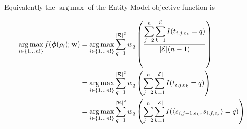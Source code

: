 \documentclass{article}
\newcommand{\entities}{{\cal E}}
\newcommand{\ent}{e}
\newcommand{\roles}{{\cal R}}
\newcommand{\tv}{t}
\newcommand{\sent}{s}
\newcommand{\weight}{\mathbf{w}}
\newcommand{\rend}{\rho}
\newcommand{\Rend}{{\cal P}}
\newcommand{\trans}{q}
\newcommand{\obj}{f}
\newcommand{\EnumS}[2]{\{#1 \ldots #2\}}
\DeclareMathOperator*{\argmax}{arg\,max}
\newcommand{\fmap}{\boldsymbol{\phi}}
\begin{document}
Equivalently the $\argmax$ of the Entity Model objective function is


\begin{equation*}
\begin{split}
    \argmax_{i \in \EnumS{1}{n!}} \obj(\fmap(\rend_i) ; \weight ) &= \argmax_{i \in \EnumS{1}{n!}} \sum^{|\roles|^2}_{\trans=1} w_\trans \left(  \frac{ \displaystyle \sum_{j = 2}^n \sum_{k=1}^{|\entities|} I(\tv_{i,j,e_k}= \trans)  }{|\entities|(n-1)} \right)\\    
    &= \argmax_{i \in \EnumS{1}{n!}} \sum^{|\roles|^2}_{\trans=1} w_\trans \left( \displaystyle \sum_{j = 2}^n \sum_{k=1}^{|\entities|} I(\tv_{i,j,e_k}= \trans)\right)\\    
    &= \argmax_{i \in \EnumS{1}{n!}} \sum^{|\roles|^2}_{\trans=1} w_\trans \left( \displaystyle \sum_{j = 2}^n \sum_{k=1}^{|\entities|}I(\langle\sent_{i,j-1,\ent_k},\sent_{i,j,\ent_k} \rangle   = \trans)\right)\\    
\end{split}
\end{equation*} 

\end{document}
